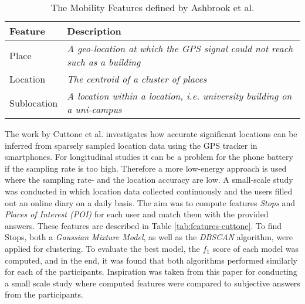 \begin{table}[]
    \centering
\begin{tabular}{|p{}|p{}|}
\hline
\textbf{Feature} & \textbf{Description}                                                               \\ \hline
Place            & \textit{A geo-location at which the GPS signal could not reach such as a building} \\ \hline
Location         & \textit{The centroid of a cluster of places}                                       \\ \hline
Sublocation      & \textit{A location within a location, i.e. university building on a uni-campus}    \\ \hline
\end{tabular}
    \caption{The Mobility Features defined by Ashbrook et al. \cite{learning_significant_locations}}
    \label{tab:features-ashbrook}
\end{table}




The work by Cuttone et al. \cite{sparse-location-2014} investigates how accurate significant locations can be inferred from sparsely sampled location data using the GPS tracker in smartphones. For longitudinal studies it can be a problem for the phone battery if the sampling rate is too high. Therefore a more low-energy approach is used where the sampling rate- and the location accuracy are low. A small-scale study was conducted in which location data collected continuously and the users filled out an online diary on a daily basis. The aim was to compute features \textit{Stops} and \textit{Places of Interest (POI)} for each user and match them with the provided answers. These features are described in Table \ref{tab:features-cuttone}.  To find Stops, both a \textit{Gaussian Mixture Model}, as well as the \textit{DBSCAN} algorithm, were applied for clustering. To evaluate the best model, the $f_1$ score of each model was computed, and in the end, it was found that both algorithms performed similarly for each of the participants. Inspiration was taken from this paper for conducting a small scale study where computed features were compared to subjective answers from the participants. 

